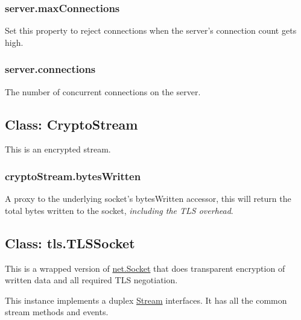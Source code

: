 \subsubsection{server.maxConnections}\label{server.maxconnections}

Set this property to reject connections when the server's connection
count gets high.

\subsubsection{server.connections}\label{server.connections}

The number of concurrent connections on the server.

\subsection{Class: CryptoStream}\label{class-cryptostream}

\begin{Shaded}
\begin{Highlighting}[]
 \NormalTok{- }  
\end{Highlighting}
\end{Shaded}

This is an encrypted stream.

\subsubsection{cryptoStream.bytesWritten}\label{cryptostream.byteswritten}

A proxy to the underlying socket's bytesWritten accessor, this will
return the total bytes written to the socket, \emph{including the TLS
overhead}.

\subsection{Class: tls.TLSSocket}\label{class-tls.tlssocket-1}

This is a wrapped version of
\href{net.html\#net_class_net_socket}{net.Socket} that does transparent
encryption of written data and all required TLS negotiation.

This instance implements a duplex
\href{stream.html\#stream_stream}{Stream} interfaces. It has all the
common stream methods and events.

